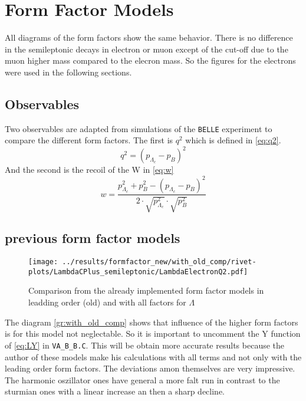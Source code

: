 \clearpage
\section{Form Factor Models}
All diagrams of the form factors show the same behavior. There is no difference 
in the semileptonic decays in electron or muon except of the cut-off due to 
the muon higher mass compared to the elecron mass. So the figures for 
the electrons were used in the following sections.

\subsection{Observables}
Two observables are adapted from simulations of the \texttt{BELLE} experiment 
to compare the different form factors.
The first is \(q^2\) which is defined in {\eqref{eq:q2}}.
\begin{equation}
  q^2 = \left( p_{\Lambda_c} - p_B \right)^2 \label{eq:q2}
\end{equation}
And the second is the recoil of the W in {\eqref{eq:w}}
\begin{equation}
  w = \frac{p^2_{\Lambda_c} +  p^2_B - \left( p_{\Lambda_c} - p_B \right)^2}
  {2 \cdot \sqrt{p^2_{\Lambda_c}} \cdot \sqrt{p^2_B}} \label{eq:w}
\end{equation}

\subsection{previous form factor models}
\begin{figure}[h]
  \centering
  \texttt{[image: ../results/formfactor\_new/with\_old\_comp/rivet-plots/LambdaCPlus\_semileptonic/LambdaElectronQ2.pdf]}
  \caption{Comparison from the already implemented form factor models in leadding order (old)
  and with all factors for \(\Lambda\)} \label{gr:with_old_comp}
\end{figure}

The diagram {\eqref{gr:with_old_comp}} shows that influence of the higher form 
factors is for this model not neglectable. So it is important to uncomment 
the Y function of {\eqref{eq:LY}} in \texttt{VA\_B\_B.C}. This will be obtain 
more accurate results because the author of these models make his calculations 
with all terms and not only with the leading order form factors. The deviations 
amon themselves are very impressive. The harmonic oszillator ones have general 
a more falt run in contrast to the sturmian ones with a linear increase an then 
a sharp decline.

